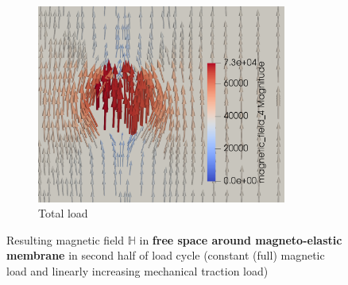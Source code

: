 \documentclass[11pt,a4paper,final]{article}
\begin{document}
\begin{figure}[h]
\begin{subfigure}{0.32\textwidth}
\centering
\includegraphics[width=0.9\textwidth]{coup_membrane_field_ls_100.png}
\caption{Total load}
\label{fig:3.12.3}
\end{subfigure}
\caption{Resulting magnetic field $\mathbb{H}$ in \textbf{free space around magneto-elastic membrane} in second half of load cycle (constant (full) magnetic load and linearly increasing mechanical traction load)}
\label{fig:3.12}
\end{figure}
\end{document}
